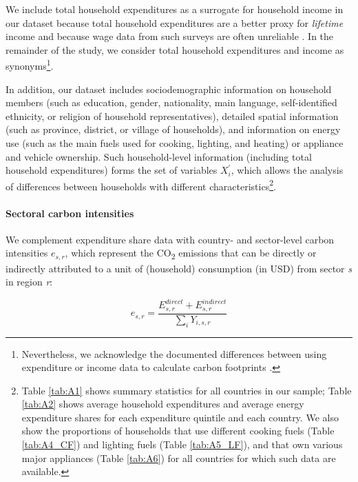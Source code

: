 \documentclass[12pt, a4paper]{article}
\begin{document}
We include total household expenditures as a surrogate for household income in our dataset because total household expenditures are a better proxy for \textit{lifetime} income \autocite{Poterba.1989,Poterba.1991,Cronin.2019} and because wage data from such surveys are often unreliable \autocite{Blundell.1998}. In the remainder of the study, we consider total household expenditures and income as synonyms\footnote{Nevertheless, we acknowledge the documented differences between using expenditure or income data to calculate carbon footprints \autocite[see][]{Levay.2023}.}.

In addition, our dataset includes sociodemographic information on household members (such as education, gender, nationality, main language, self-identified ethnicity, or religion of household representatives), detailed spatial information (such as province, district, or village of households), and information on energy use (such as the main fuels used for cooking, lighting, and heating) or appliance and vehicle ownership. Such household-level information (including total household expenditures) forms the set of variables $X_{i}^{'}$, which allows the analysis of differences between households with different characteristics\footnote{Table \ref{tab:A1} shows summary statistics for all countries in our sample; Table \ref{tab:A2} shows average household expenditures and average energy expenditure shares for each expenditure quintile and each country. We also show the proportions of households that use different cooking fuels (Table \ref{tab:A4_CF}) and lighting fuels (Table \ref{tab:A5_LF}), and that own various major appliances (Table \ref{tab:A6}) for all countries for which such data are available.}.

\paragraph{Sectoral carbon intensities} We complement expenditure share data with country- and sector-level carbon intensities $e_{s,r}$, which represent the  CO\textsubscript{2} emissions that can be directly or indirectly attributed to a unit of (household) consumption (in USD) from sector \textit{s} in region \textit{r}:

\begin{equation}
    e_{s,r} = \frac{E_{s,r}^{direct}+E_{s,r}^{indirect}}{\sum_{i} Y_{i,s,r}}
\end{equation}
\end{document}
